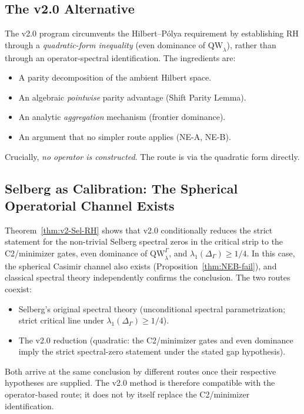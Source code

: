 \documentclass[12pt,a4paper]{article}
\theoremstyle{definition}
\theoremstyle{remark}
\newcommand{\QW}{\mathrm{QW}}
\newcommand{\Delop}{\Delta_{\Gamma}}
\begin{document}
\subsection{The v2.0 Alternative}

The v2.0 program circumvents the Hilbert--Pólya requirement by
establishing RH through a \emph{quadratic-form inequality} (even dominance
of $\QW_\lambda$), rather than through an operator-spectral identification.
The ingredients are:
\begin{itemize}
\item A parity decomposition of the ambient Hilbert space.
\item An algebraic \emph{pointwise} parity advantage (Shift Parity Lemma).
\item An analytic \emph{aggregation} mechanism (frontier dominance).
\item An argument that no simpler route applies (NE-A, NE-B).
\end{itemize}
Crucially, \emph{no operator is constructed}. The route is via the
quadratic form directly.

\subsection{Selberg as Calibration: The Spherical Operatorial Channel Exists}

Theorem~\ref{thm:v2-Sel-RH} shows that v2.0 conditionally reduces the strict
statement for the non-trivial Selberg spectral zeros in the critical strip to the C2/minimizer gates, even dominance of
$\QW^\Gamma_\lambda$, and $\lambda_1(\Delop)\ge 1/4$.  In this case, the
spherical Casimir channel also exists (Proposition~\ref{thm:NEB-fail}), and
classical spectral theory independently confirms the conclusion.  The two
routes coexist:
\begin{itemize}
\item Selberg's original spectral theory (unconditional spectral
  parametrization; strict critical line under $\lambda_1(\Delop)\ge 1/4$).
\item The v2.0 reduction (quadratic: the C2/minimizer gates and even dominance
  imply the strict spectral-zero statement under the stated gap hypothesis).
\end{itemize}
Both arrive at the same conclusion by different routes once their respective
hypotheses are supplied. The v2.0 method is therefore compatible with the
operator-based route; it does not by itself replace the C2/minimizer
identification.
\end{document}

